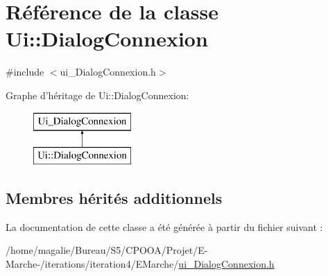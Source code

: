 \hypertarget{class_ui_1_1_dialog_connexion}{\section{Référence de la classe Ui\-:\-:Dialog\-Connexion}
\label{class_ui_1_1_dialog_connexion}
}


{\ttfamily \#include $<$ui\-\_\-\-Dialog\-Connexion.\-h$>$}

Graphe d'héritage de Ui\-:\-:Dialog\-Connexion\-:\begin{figure}[H]
\begin{center}
\leavevmode
\includegraphics[height=2.000000cm]{class_ui_1_1_dialog_connexion}
\end{center}
\end{figure}
\subsection*{Membres hérités additionnels}


La documentation de cette classe a été générée à partir du fichier suivant \-:\begin{DoxyCompactItemize}
\item 
/home/magalie/\-Bureau/\-S5/\-C\-P\-O\-O\-A/\-Projet/\-E-\/\-Marche-\//iterations/iteration4/\-E\-Marche/\hyperlink{ui___dialog_connexion_8h}{ui\-\_\-\-Dialog\-Connexion.\-h}\end{DoxyCompactItemize}

